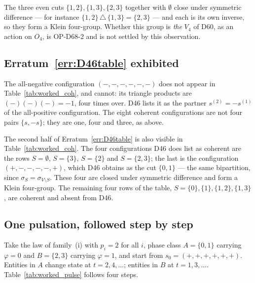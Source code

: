 \documentclass[11pt,a4paper]{article}
\def\mathcal#1{#1}%
\begin{document}
The three even cuts $\{1,2\},\{1,3\},\{2,3\}$ together with $\emptyset$ close under symmetric difference --- for instance $\{1,2\}\,\triangle\,\{1,3\}=\{2,3\}$ --- and each is its own inverse, so they form a Klein four-group. Whether this group is \emph{the} $V_4$ of D60, as an action on $\mathcal{O}_4$, is OP-D68-2 and is not settled by this observation.

\subsection{Erratum~\ref{err:D46table} exhibited}

The all-negative configuration $(-,-,-,-,-,-)$ does not appear in Table~\ref{tab:worked_coh}, and cannot: its triangle products are $(-)(-)(-)=-1$, four times over. D46 lists it as the partner $s^{(2)}=-s^{(1)}$ of the all-positive configuration. The eight coherent configurations are not four pairs $\{s,-s\}$; they are one, four and three, as above.

The second half of Erratum~\ref{err:D46table} is also visible in Table~\ref{tab:worked_coh}. The four configurations D46 does list as coherent are the rows $S=\emptyset$, $S=\{3\}$, $S=\{2\}$ and $S=\{2,3\}$; the last is the configuration $(+,-,-,-,-,+)$, which D46 obtains as the cut $\{0,1\}$ --- the same bipartition, since $\sigma_S=\sigma_{V\setminus S}$. These four are closed under symmetric difference and form a Klein four-group. The remaining four rows of the table, $S=\{0\},\{1\},\{1,2\},\{1,3\}$, are coherent and absent from D46.

\subsection{One pulsation, followed step by step}
\label{subsec:worked_pulse}

Take the law of family~(i) with $p_i=2$ for all $i$, phase class $A=\{0,1\}$ carrying $\varphi=0$ and $B=\{2,3\}$ carrying $\varphi=1$, and start from $s_0=(+,+,+,+,+,+)$. Entities in $A$ change state at $t=2,4,\dots$; entities in $B$ at $t=1,3,\dots$. Table~\ref{tab:worked_pulse} follows four steps.
\end{document}
